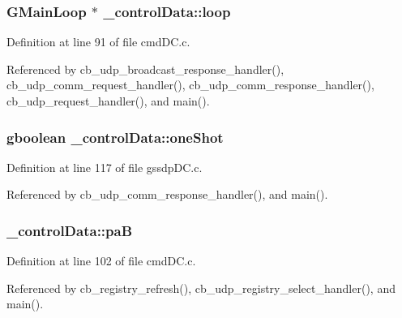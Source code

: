 \subsubsection[{loop}]{\setlength{\rightskip}{0pt plus 5cm}G\+Main\+Loop $\ast$ \+\_\+control\+Data\+::loop}\label{struct__control_data_ae1b70bafbd5eb568c6ca339664959216}


Definition at line 91 of file cmd\+D\+C.\+c.



Referenced by cb\+\_\+udp\+\_\+broadcast\+\_\+response\+\_\+handler(), cb\+\_\+udp\+\_\+comm\+\_\+request\+\_\+handler(), cb\+\_\+udp\+\_\+comm\+\_\+response\+\_\+handler(), cb\+\_\+udp\+\_\+request\+\_\+handler(), and main().

\hypertarget{struct__control_data_a772b5b4e4d92eee73100445963cbe682}{}
\subsubsection[{one\+Shot}]{\setlength{\rightskip}{0pt plus 5cm}gboolean \+\_\+control\+Data\+::one\+Shot}\label{struct__control_data_a772b5b4e4d92eee73100445963cbe682}


Definition at line 117 of file gssdp\+D\+C.\+c.



Referenced by cb\+\_\+udp\+\_\+comm\+\_\+response\+\_\+handler(), and main().

\hypertarget{struct__control_data_a93f6e099a56c0d476607b4bd5a9dfa58}{}
\subsubsection[{pa\+B}]{ \+\_\+control\+Data\+::pa\+B}\label{struct__control_data_a93f6e099a56c0d476607b4bd5a9dfa58}


Definition at line 102 of file cmd\+D\+C.\+c.



Referenced by cb\+\_\+registry\+\_\+refresh(), cb\+\_\+udp\+\_\+registry\+\_\+select\+\_\+handler(), and main().

\hypertarget{struct__control_data_aae1d10aba11260e77341d9f5fa6055e2}{}
